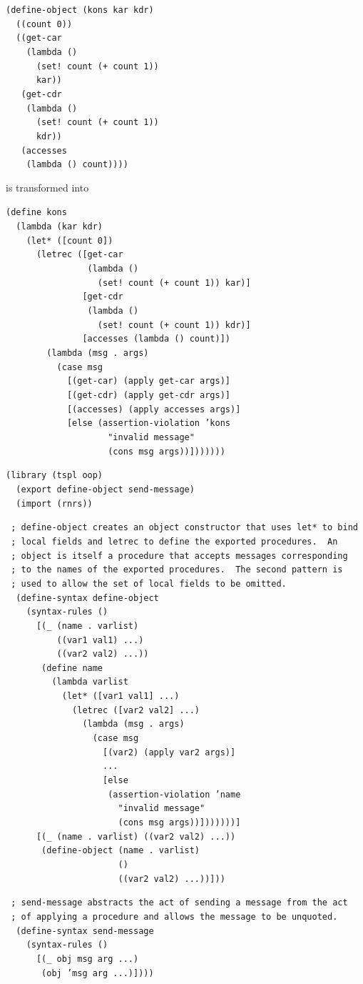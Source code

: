 \begin{alltt}
(define-object (kons kar kdr)
  ((count 0))
  ((get-car
    (lambda ()
      (set! count (+ count 1))
      kar))
   (get-cdr
    (lambda ()
      (set! count (+ count 1))
      kdr))
   (accesses
    (lambda () count))))
\end{alltt}


is transformed into


\begin{alltt}
(define kons
  (lambda (kar kdr)
    (let* ([count 0])
      (letrec ([get-car
                (lambda ()
                  (set! count (+ count 1)) kar)]
               [get-cdr
                (lambda ()
                  (set! count (+ count 1)) kdr)]
               [accesses (lambda () count)])
        (lambda (msg . args)
          (case msg
            [(get-car) (apply get-car args)]
            [(get-cdr) (apply get-cdr args)]
            [(accesses) (apply accesses args)]
            [else (assertion-violation 'kons
                    "invalid message"
                    (cons msg args))]))))))
\end{alltt}


\begin{alltt}
(library (tspl oop)
  (export define-object send-message)
  (import (rnrs))

 ; define-object creates an object constructor that uses let* to bind
 ; local fields and letrec to define the exported procedures.  An
 ; object is itself a procedure that accepts messages corresponding
 ; to the names of the exported procedures.  The second pattern is
 ; used to allow the set of local fields to be omitted.
  (define-syntax define-object
    (syntax-rules ()
      [(\_{} (name . varlist)
          ((var1 val1) ...)
          ((var2 val2) ...))
       (define name
         (lambda varlist
           (let* ([var1 val1] ...)
             (letrec ([var2 val2] ...)
               (lambda (msg . args)
                 (case msg
                   [(var2) (apply var2 args)]
                   ...
                   [else
                    (assertion-violation 'name
                      "invalid message"
                      (cons msg args))]))))))]
      [(\_{} (name . varlist) ((var2 val2) ...))
       (define-object (name . varlist)
                      ()
                      ((var2 val2) ...))]))

 ; send-message abstracts the act of sending a message from the act
 ; of applying a procedure and allows the message to be unquoted.
  (define-syntax send-message
    (syntax-rules ()
      [(\_{} obj msg arg ...)
       (obj 'msg arg ...)])))
\end{alltt}


